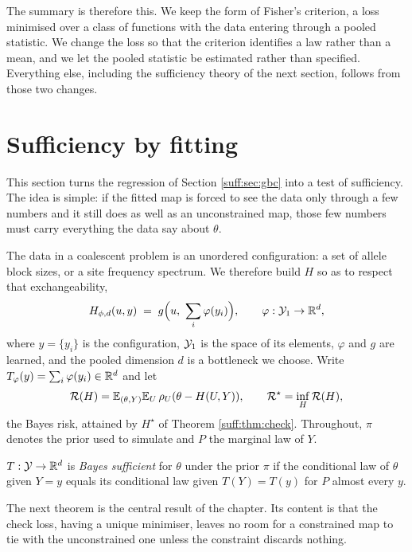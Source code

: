 The summary is therefore this. We keep the form of Fisher's criterion, a loss minimised over
a class of functions with the data entering through a pooled statistic. We change the loss so
that the criterion identifies a law rather than a mean, and we let the pooled statistic be
estimated rather than specified. Everything else, including the sufficiency theory of the
next section, follows from those two changes.

\section{Sufficiency by fitting}
\label{suff:sec:suff}

This section turns the regression of Section \ref{suff:sec:gbc} into a test of sufficiency.
The idea is simple: if the fitted map is forced to see the data only through a few numbers and
it still does as well as an unconstrained map, those few numbers must carry everything the
data say about $\theta$.

The data in a coalescent problem is an unordered configuration: a set of allele block sizes,
or a site frequency spectrum. We therefore build $H$ so as to respect that exchangeability,
\begin{equation}
H_{\phi,d}(u,y) \;=\; g\Big(u,\ \sum_{i} \varphi(y_i)\Big),
\qquad \varphi:\mathcal{Y}_1\to\mathbb{R}^d,
\label{suff:eq:deepsets}
\end{equation}
where $y=\{y_i\}$ is the configuration, $\mathcal{Y}_1$ is the space of its elements, $\varphi$ and
$g$ are learned, and the pooled dimension $d$ is a bottleneck we choose. Write
$T_\varphi(y)=\sum_i \varphi(y_i)\in\mathbb{R}^d$ and let
\[
\mathcal{R}(H) = \mathbb{E}_{(\theta,Y)}\mathbb{E}_U\,\rho_U(\theta - H(U,Y)),
\qquad
\mathcal{R}^\star = \inf_H \mathcal{R}(H),
\]
the Bayes risk, attained by $H^\star$ of Theorem \ref{suff:thm:check}. Throughout, $\pi$ denotes
the prior used to simulate and $P$ the marginal law of $Y$.

\begin{definition}
$T:\mathcal{Y}\to\mathbb{R}^d$ is \emph{Bayes sufficient} for $\theta$ under the prior $\pi$ if the
conditional law of $\theta$ given $Y=y$ equals its conditional law given $T(Y)=T(y)$ for
$P$ almost every $y$.
\end{definition}

The next theorem is the central result of the chapter. Its content is that the check loss,
having a unique minimiser, leaves no room for a constrained map to tie with the unconstrained
one unless the constraint discards nothing.

